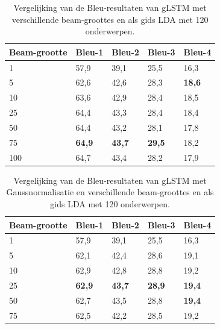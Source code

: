     \begin{table}
    	\centering
    	\begin{tabular}{lllll}
    		Beam-grootte                   & Bleu-1 & Bleu-2 & Bleu-3 & Bleu-4  \\ \hline
	    	1	      & 57,9   & 39,1   & 25,5   & 16,3        \\ 
    		5         & 62,6   & 42,6   & 28,3   & \textbf{18,6}     \\
    		10         & 63,6   & 42,9   & 28,4   & 18,5    \\
    		25        & 64,4   & 43,3   & 28,4   & 18,4     \\
    		50		  & 64,4   & 43,2   & 28,1   & 17,8    \\
    		75        & \textbf{64,9}   & \textbf{43,7}   & \textbf{29,5}   & 18,2    \\
    	    100		  & 64,7   & 43,4   & 28,2   & 17,9     \\\hline
    	\end{tabular}
    	\caption{Vergelijking van de Bleu-resultaten van gLSTM met verschillende beam-groottes en als gids LDA met 120 onderwerpen.}	
    	\label{table:beam}
    \end{table}

    \begin{table}
    	\centering
    	\begin{tabular}{lllll}
    		Beam-grootte & Bleu-1 & Bleu-2 & Bleu-3 & Bleu-4  \\ \hline
    		1	      & 57,9   & 39,1   & 25,5   & 16,3        \\ 
    		5         & 62,1   & 42,4   & 28,6   & 19,1     \\
    		10        & 62,9   & 42,8   & 28,8   & 19,2    \\
    		25        & \textbf{62,9}   & \textbf{43,7}   & \textbf{28,9}   & \textbf{19,4}     \\
    		50		  & 62,7   & 43,5   & 28,8   & \textbf{19,4}    \\
    		75        & 62,5   & 42,2   & 28,5   & 19,2    \\ \hline
    	\end{tabular}
    	\caption{Vergelijking van de Bleu-resultaten van gLSTM met Gaussnormalisatie en verschillende beam-groottes en als gids LDA met 120 onderwerpen.}	
    	\label{table:beam_gauss}
    \end{table}

